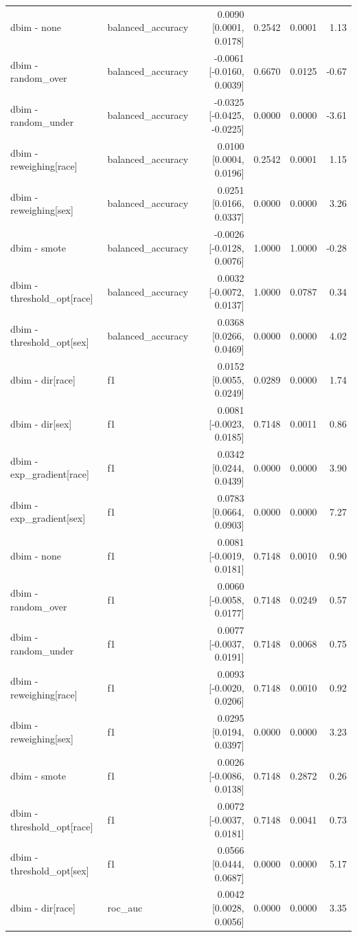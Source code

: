 \begin{table}[t]
{\begin{tabular}{llrrrr}
dbim - none & balanced\_accuracy & 0.0090 [0.0001, 0.0178] & 0.2542 & 0.0001 & 1.13 \\
dbim - random\_over & balanced\_accuracy & -0.0061 [-0.0160, 0.0039] & 0.6670 & 0.0125 & -0.67 \\
dbim - random\_under & balanced\_accuracy & -0.0325 [-0.0425, -0.0225] & 0.0000 & 0.0000 & -3.61 \\
dbim - reweighing[race] & balanced\_accuracy & 0.0100 [0.0004, 0.0196] & 0.2542 & 0.0001 & 1.15 \\
dbim - reweighing[sex] & balanced\_accuracy & 0.0251 [0.0166, 0.0337] & 0.0000 & 0.0000 & 3.26 \\
dbim - smote & balanced\_accuracy & -0.0026 [-0.0128, 0.0076] & 1.0000 & 1.0000 & -0.28 \\
dbim - threshold\_opt[race] & balanced\_accuracy & 0.0032 [-0.0072, 0.0137] & 1.0000 & 0.0787 & 0.34 \\
dbim - threshold\_opt[sex] & balanced\_accuracy & 0.0368 [0.0266, 0.0469] & 0.0000 & 0.0000 & 4.02 \\
dbim - dir[race] & f1 & 0.0152 [0.0055, 0.0249] & 0.0289 & 0.0000 & 1.74 \\
dbim - dir[sex] & f1 & 0.0081 [-0.0023, 0.0185] & 0.7148 & 0.0011 & 0.86 \\
dbim - exp\_gradient[race] & f1 & 0.0342 [0.0244, 0.0439] & 0.0000 & 0.0000 & 3.90 \\
dbim - exp\_gradient[sex] & f1 & 0.0783 [0.0664, 0.0903] & 0.0000 & 0.0000 & 7.27 \\
dbim - none & f1 & 0.0081 [-0.0019, 0.0181] & 0.7148 & 0.0010 & 0.90 \\
dbim - random\_over & f1 & 0.0060 [-0.0058, 0.0177] & 0.7148 & 0.0249 & 0.57 \\
dbim - random\_under & f1 & 0.0077 [-0.0037, 0.0191] & 0.7148 & 0.0068 & 0.75 \\
dbim - reweighing[race] & f1 & 0.0093 [-0.0020, 0.0206] & 0.7148 & 0.0010 & 0.92 \\
dbim - reweighing[sex] & f1 & 0.0295 [0.0194, 0.0397] & 0.0000 & 0.0000 & 3.23 \\
dbim - smote & f1 & 0.0026 [-0.0086, 0.0138] & 0.7148 & 0.2872 & 0.26 \\
dbim - threshold\_opt[race] & f1 & 0.0072 [-0.0037, 0.0181] & 0.7148 & 0.0041 & 0.73 \\
dbim - threshold\_opt[sex] & f1 & 0.0566 [0.0444, 0.0687] & 0.0000 & 0.0000 & 5.17 \\
dbim - dir[race] & roc\_auc & 0.0042 [0.0028, 0.0056] & 0.0000 & 0.0000 & 3.35 \\

\end{tabular}}
\end{table}
